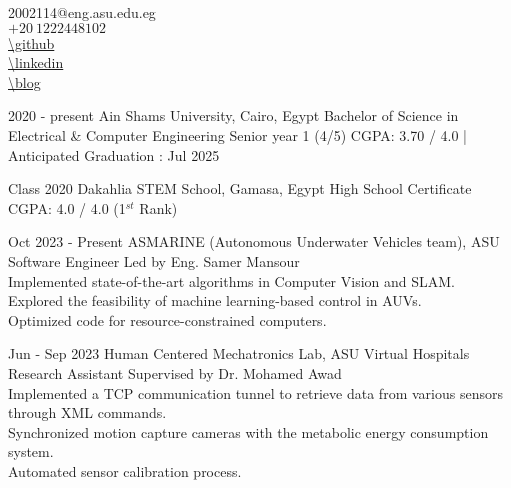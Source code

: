 \documentclass[hidelinks]{report}
\begin{document}
\noindent
\begin{minipage}{.4\textwidth}
    \vspace{-1mm}
\end{minipage}%
\hfill\hspace{.2\textwidth}
\begin{minipage}{.5\textwidth}
 \large
    2002114@eng.asu.edu.eg \\[.2\baselineskip]
    $+20 \ 1222448102$ \\[.2\baselineskip]
    \url{\github} \\[.2\baselineskip]
    \url{\linkedin} \\ %
    \url{\blog} 
\end{minipage}


\vspace{2mm}

\large 
{}

\entry
    {2020 - present} 
    {Ain Shams University, \normalfont Cairo, Egypt  }
    {Bachelor of Science in Electrical \& Computer Engineering }
    {Senior year 1 (4/5)\hspace{2mm} \textbar \hspace{2mm} CGPA: 3.70 / 4.0 | Anticipated Graduation : Jul 2025}  

\entry
    {Class 2020}
    {Dakahlia STEM School, \normalfont Gamasa, Egypt}
    {High School Certificate}
    {CGPA: 4.0 / 4.0 (1$^{st}$ Rank)}

\vspace{2mm}


\entry
    {Oct 2023 - Present }
    {ASMARINE (Autonomous Underwater Vehicles team), \normalfont ASU  }
    {Software Engineer}
    {
      Led by Eng. Samer Mansour \\
      \textbullet Implemented state-of-the-art algorithms in Computer Vision and SLAM. \\
      \textbullet Explored the feasibility of machine learning-based control in AUVs. \\
      \textbullet Optimized code for resource-constrained computers.
    }

\entry
    {Jun - Sep 2023}
    {Human Centered Mechatronics Lab, \normalfont ASU Virtual Hospitals }
    {Research Assistant}
    {
      Supervised by Dr. Mohamed Awad \\
      \textbullet Implemented a TCP communication tunnel to retrieve data from various sensors through XML commands. \\
      \textbullet Synchronized motion capture cameras with the metabolic energy consumption system. \\
      \textbullet Automated sensor calibration process.
    }
\end{document}
